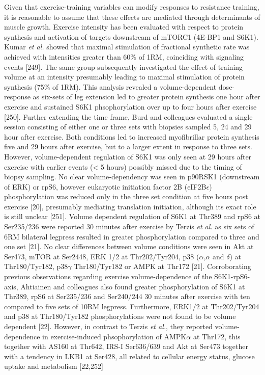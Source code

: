 \documentclass[twoside,10pt]{gihclass} %
\begin{document}
Given that exercise-training variables can modify responses to resistance training, it is reasonable to assume that these effects are mediated through determinants of muscle growth.
Exercise intensity has been evaluated with respect to protein synthesis and activation of targets downstream of mTORC1 (4E-BP1 and S6K1).
Kumar \emph{et al.} showed that maximal stimulation of fractional synthetic rate was achieved with intensities greater than 60\% of 1RM, coinciding with signaling events
{[}249{]}.
The same group subsequently investigated the effect of training volume at an intensity presumably leading to maximal stimulation of protein synthesis (75\% of 1RM).
This analysis revealed a volume-dependent dose-response as six-sets of leg extension led to greater protein synthesis one hour after exercise and sustained S6K1 phsophorylation over up to four hours after exercise
{[}250{]}.
Further extending the time frame, Burd and colleagues evaluated a single session consisting of either one or three sets with biopsies sampled 5, 24 and 29 hour after exercise. Both conditions led to increased myofibrillar protein synthesis five and 29 hours after exercise, but to a larger extent in response to three sets.
However, volume-dependent regulation of S6K1 was only seen at 29 hours after exercise with earlier events (\textless{} 5 hours) possibly missed due to the timing of biopsy sampling.
No clear volume-dependency was seen in p90RSK1 (downstream of ERK) or rpS6, however eukaryotic initiation factor 2B (eIF2B\(\epsilon\)) phosphorylation was reduced only in the three set condition at five hours post exercise {[}20{]}, presumably mediating translation initiation, although its exact role is still unclear
{[}251{]}.
Volume dependent regulation of S6K1 at Thr389 and rpS6 at Ser235/236 were reported 30 minutes after exercise by Terzis \emph{et al.} as six sets of 6RM bilateral legpress resulted in greater phosphorylation compared to three and one set
{[}21{]}.
No clear differences between volume conditions were seen in Akt at Ser473, mTOR at Ser2448, ERK 1/2 at Thr202/Tyr204, p38 (\(\alpha\),\(\alpha\) and \(\delta\)) at Thr180/Tyr182, p38\(\gamma\) Thr180/Tyr182 or AMPK at Thr172
{[}21{]}.
Corroborating previous observations regarding exercise volume-dependence of the S6K1-rpS6-axis, Ahtiainen and colleagues also found greater phosphorylation of S6K1 at Thr389, rpS6 at Ser235/236 and Ser240/244 30 minutes after exercise with ten compared to five sets of 10RM legpress.
Furthermore, ERK1/2 at Thr202/Tyr204 and p38 at Thr180/Tyr182 phosphorylations were not found to be volume dependent
{[}22{]}.
However, in contrast to Terzis \emph{et al.}, they reported volume-dependence in exercise-induced phsophorylation of AMPK\(\alpha\) at Thr172, this together with AS160 at Thr642, IRS-I Ser636/639 and Akt at Ser473 together with a tendency in LKB1 at Ser428, all related to cellular energy status, glucose uptake and metabolism
{[}22,252{]}
\end{document}
